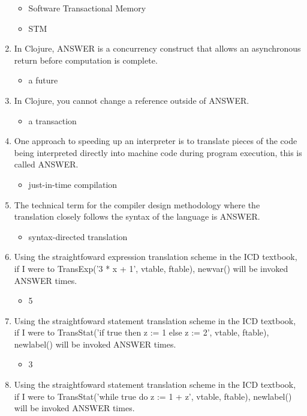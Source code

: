 \documentclass{exam}
\begin{document}
\begin{enumerate}
\begin{itemize}
\item Software Transactional Memory
\item STM
\end{itemize}
\item In Clojure, ANSWER is a concurrency construct that allows an asynchronous return before computation is complete.
\begin{itemize}
\item a future
\end{itemize}
\item In Clojure, you cannot change a reference outside of ANSWER.
\begin{itemize}
\item a transaction
\end{itemize}
\item One approach to speeding up an interpreter is to translate pieces of the code being interpreted directly into machine code during program execution, this is called ANSWER.
\begin{itemize}
\item just-in-time compilation
\end{itemize}
\item The technical term for the compiler design methodology where the translation closely follows the syntax of the language is ANSWER.
\begin{itemize}
\item syntax-directed translation
\end{itemize}
\item Using the straightfoward expression translation scheme in the ICD textbook, if I were to TransExp('3 * x + 1', vtable, ftable), newvar() will be invoked ANSWER times.
\begin{itemize}
\item 5
\end{itemize}
\item Using the straightfoward statement translation scheme in the ICD textbook, if I were to TransStat('if true then z := 1 else z := 2', vtable, ftable), newlabel() will be invoked ANSWER times.
\begin{itemize}
\item 3
\end{itemize}
\item Using the straightfoward statement translation scheme in the ICD textbook, if I were to TransStat('while true do z := 1 + z', vtable, ftable), newlabel() will be invoked ANSWER times.
\begin{itemize}

\end{itemize}
\end{enumerate}
\end{document}
